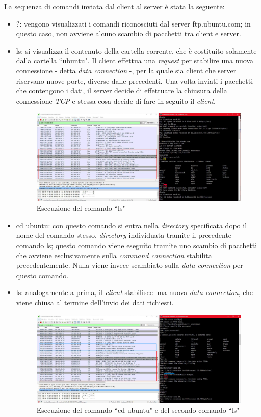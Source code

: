 \documentclass[a4paper, 12pt]{report}
\begin{document}
La sequenza di comandi inviata dal client al server è stata la seguente:
\begin{itemize}
    \item ?: vengono visualizzati i comandi riconosciuti dal server ftp.ubuntu.com; in questo caso, non avviene alcuno scambio di pacchetti tra client e server.
    \item ls: si visualizza il contenuto della cartella corrente, che è costituito solamente dalla cartella ``ubuntu". Il client effettua una \textit{request} per stabilire una nuova connessione - detta 
    \textit{data connection} -, per la quale sia client che server riservano nuove porte, diverse dalle precedenti. Una volta inviati i pacchetti che contengono i dati, il server decide di effettuare
    la chiusura della connessione \textit{TCP} e stessa cosa decide di fare in seguito il \textit{client}.

    \begin{figure}[H]
        \centering
        \includegraphics[width=\linewidth]{images/image1_3.png}
        \caption{Esecuzione del comando ``ls"}
    \end{figure}

    \item cd ubuntu: con questo comando si entra nella \textit{directory} specificata dopo il nome del comando stesso, \textit{directory} individuata tramite il precedente comando ls; questo comando viene eseguito tramite
    uno scambio di pacchetti che avviene esclusivamente sulla \textit{command connection} stabilita precedentemente. Nulla viene invece scambiato sulla \textit{data connection} per questo comando.
    \item ls: analogamente a prima, il \textit{client} stabilisce una nuova \textit{data connection}, che viene chiusa al termine dell’invio dei dati richiesti.
    
    \begin{figure}[H]
        \centering
        \includegraphics[width=\linewidth]{images/image1_4.png}
        \caption{Esecuzione del comando ``cd ubuntu" e del secondo comando ``ls"}
    \end{figure}


\end{itemize}
\end{document}

